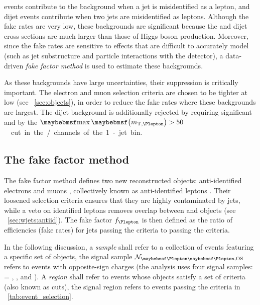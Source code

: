 
\Wjets events contribute to the background when a jet is misidentified as a lepton, and 
dijet events contribute when two jets are misidentified as leptons. Although the fake 
rates are very low, these backgrounds are significant because the \Wjets and dijet cross 
sections are much larger than those of Higgs boson production. Moreover, since the fake 
rates are sensitive to effects that are difficult to accurately model (such as jet 
substructure and particle interactions with the detector), a data-driven \textit{fake 
factor method} is used to estimate these backgrounds.

As these backgrounds have large uncertainties, their suppression is critically important. 
The electron and muon selection criteria are chosen to be tighter at low \pt (see 
\Section~\ref{sec:objects}), in order to reduce the fake rates where these backgrounds 
are largest. The dijet background is additionally rejected by requiring significant \met 
and by the \unit{$\maxmtw > 50$}{\GeV} cut in the \emch/\mech channels of the 1-jet bin.



\subsection{The fake factor method}
\label{sec:wjets:fakefactor_method}

The fake factor method defines two new reconstructed objects: anti-identified electrons 
\antiid{\Pe} and muons \antiid{\Pmu}, collectively known as anti-identified leptons 
\antiid{\Plepton}. Their loosened selection criteria ensures that they are highly 
contaminated by jets, while a veto on identified leptons \id{\Plepton} removes overlap 
between \id{\Plepton} and \antiid{\Plepton} objects (see \Section~\ref{sec:wjets:antiid}).
The fake factor $f_{\Plepton}$ is then defined as the ratio of efficiencies (\ie fake 
rates) for jets passing the \id{\Plepton} criteria to passing the \antiid{\Plepton} 
criteria.

In the following discussion, a \textit{sample} shall refer to a collection of events 
featuring a specific set of objects, \eg the signal sample 
$\mathcal{N}_{\id{\Plepton}\id{\Plepton}\text{,OS}}$ refers to \id{\Plepton}\id{\Plepton} 
events with opposite-sign charges (the \HWW analysis uses four signal samples: 
\id{\Plepton}\id{\Plepton} = \id{\Pe}\id{\Pe}, \id{\Pmu}\id{\Pmu}, \id{\Pe}\id{\Pmu} and 
\id{\Pmu}\id{\Pe}). A \textit{region} shall refer to events whose objects satisfy a set 
of criteria (also known as cuts), \eg the signal region refers to events passing the 
criteria in \Table~\ref{tab:event_selection}.

